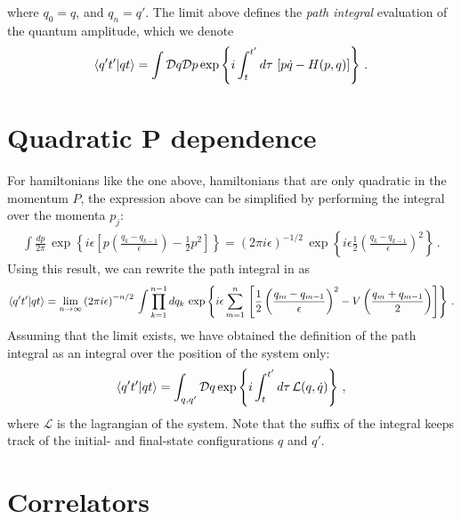 where $q_0 = q$, and $q_n = q'$. The limit above defines the {\em
  path integral} evaluation of the quantum amplitude, which we denote 
\begin{align}
  \label{eq:PathIntDefZero}
  \langle q't' | qt \rangle = 
  \int \mathcal{D}q \mathcal{D}p \exp \left\{
  i \int_t^{t'} d\tau\, \left[
  p \dot{q} - H(p,q)
  \right]
  \right\}\, .
\end{align}

\section{Quadratic P dependence}
\label{sec:quadr-kinet-term}

For hamiltonians like the one above, \ie hamiltonians that are only
quadratic in the momentum $\hat{P}$, the expression above can be
simplified by performing the integral over the momenta $p_j$:
\begin{align}
  \int \frac{dp}{2\pi}\, \exp\left\{
  i\epsilon\left[
  p \left(\frac{q_k-q_{k-1}}{\epsilon}\right) - \frac12 p^2
  \right]
  \right\} = \left(2\pi i \epsilon\right)^{-1/2}\,
  \exp\left\{i\epsilon
  \frac12\left(\frac{q_k-q_{k-1}}{\epsilon}\right)^2\right\}\, .
\end{align}
Using this result, we can rewrite the path integral in
 as
\begin{align}
  \label{eq:PathIntDefOne}
  \langle q't' | qt \rangle = \lim_{n\to\infty}
  \left(2\pi i \epsilon\right)^{-n/2}\,
  \int \prod_{k=1}^{n-1}dq_k\, 
  \exp \left\{
  i \epsilon \sum_{m=1}^{n}
  \, \left[
  \frac12 \left(\frac{q_m-q_{m-1}}{\epsilon}\right)^2
  -V\left(\frac{q_m+q_{m-1}}{2}\right)
  \right]
  \right\}\, .
\end{align}
Assuming that the limit exists, we have obtained the definition of the
path integral as an integral over the position of the system only: 
\begin{align}
  \label{eq:PathIntDef}
  \langle q't' | qt \rangle = 
  \int_{q,q'} \mathcal{D}q \exp \left\{
  i \int_t^{t'} d\tau\,  \mathcal{L}(q,\dot{q})
  \right\}\, ,
\end{align}
where $\mathcal{L}$ is the lagrangian of the system. Note that the
suffix of the integral keeps track of the initial- and final-state
configurations $q$ and $q'$. 

\section{Correlators}
\label{sec:correlators}

